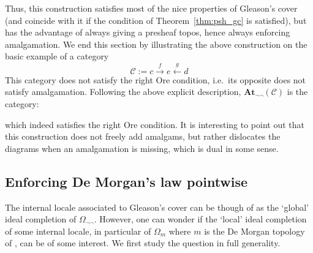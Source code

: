 \documentclass{article}
\newcommand{\At}{\mathbf{At}}
\newcommand{\id}{\operatorname{id}}
\begin{document}
\noindent Thus, this construction satisfies most of the nice properties of Gleason's cover (and coincide with it if the condition of Theorem~\ref{thm:psh_gc} is satisfied), but has the advantage of always giving a presheaf topos, hence always enforcing amalgamation. 
We end this section by illustrating the above construction on the basic example of a category \[\mathcal{C}:=c\xrightarrow{f} e \xleftarrow{g} d\]
This category does not satisfy the right Ore condition, i.e.~its opposite does not satisfy amalgamation. Following the above explicit description, $\At_{\neg\neg}(\mathcal{C})$ is the category:
\begin{center}
\end{center}
which indeed satisfies the right Ore condition. 
It is interesting to point out that this construction does not freely add amalgams, but rather dislocates the diagrams when an amalgamation is missing, which is dual in some sense.

\subsection{Enforcing De Morgan's law pointwise}\label{dml_pt}
The internal locale associated to Gleason's cover can be though of as the `global' ideal completion of $\Omega_{\neg\neg}$. However, one can wonder if the `local' ideal completion of some internal locale, in particular of $\Omega_m$ where $m$ is the De Morgan topology of \cite{caramello2009morgan}, can be of some interest. We first study the question in full generality. 
\end{document}
